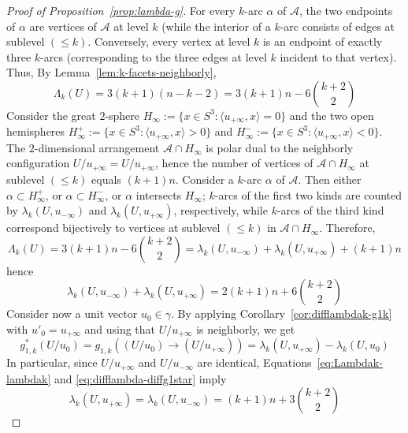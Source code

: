 \documentclass[11pt]{article}
\renewcommand{\leq}{\leqslant}
\begin{document}
\begin{proof}[Proof of Proposition~\ref{prop:lambda-g}]
For every $k$-arc $\alpha$ of  $\mathcal{A}$, the two endpoints of $\alpha$ are vertices of $\mathcal{A}$ at level $k$ (while the interior of a $k$-arc consists of edges at sublevel $(\leq k)$. Conversely, every vertex at level $k$ is an endpoint of exactly three $k$-arcs (corresponding to the three edges at level $k$ incident to that vertex). Thus, By Lemma~\ref{lem:k-facets-neighborly},
\begin{equation}
\label{eq:Lambdak}
\Lambda_k(U)=3(k+1)(n-k-2)=3(k+1)n-6\binom{k+2}{2}
\end{equation}
Consider the great $2$-sphere $H_{\infty}:=\{x\in S^3\colon \langle u_{+\infty},x\rangle =0\}$ and the two open hemispheres $H^+_{\infty}:=\{x\in S^3\colon \langle u_{+\infty},x\rangle > 0\}$
and $H^-_{\infty}:=\{x\in S^3\colon \langle u_{+\infty},x\rangle < 0\}$. The $2$-dimensional arrangement $\mathcal{A}\cap H_{\infty}$ is polar dual to the neighborly configuration $U/u_{+\infty}=U/u_{+\infty}$, hence the number of vertices of $\mathcal{A}\cap H_{\infty}$ at sublevel $(\leq k)$ equals $(k+1)n$.
%
Consider a $k$-arc $\alpha$ of $\mathcal{A}$. Then either $\alpha \subset H^+_{\infty}$, or $\alpha \subset H^-_{\infty}$, or $\alpha$ intersects $H_\infty$; $k$-arcs of the first two kinds are counted by $\lambda_k(U,u_{-\infty})$ and $\lambda_k(U,u_{+\infty})$, respectively, while $k$-arcs of the third kind correspond bijectively to vertices at sublevel $(\leq k)$ in $\mathcal{A}\cap H_{\infty}$. Therefore,
\[
\Lambda_k(U)=3(k+1)n-6\binom{k+2}{2}=\lambda_k(U,u_{-\infty}) + \lambda_k(U,u_{+\infty}) +(k+1)n
\]
hence
\begin{equation}
\label{eq:Lambdak-lambdak}
\lambda_k(U,u_{-\infty}) + \lambda_k(U,u_{+\infty}) = 2(k+1)n + 6\binom{k+2}{2}
\end{equation}
Consider now a unit vector $u_0 \in \gamma$. By applying Corollary~\ref{cor:difflambdak-g1k} with $u'_0 =u_{+\infty}$ and using that $U/u_{+\infty}$ is neighborly, we get
\begin{equation}
\label{eq:difflambda-diffg1star}
g^*_{1,k}(U/u_0) = g_{1,k}((U/u_0) \to (U/u_{+\infty}))
= \lambda_k(U,u_{+\infty}) - \lambda_k(U,u_0)
\end{equation}
In particular, since $U/u_{+\infty}$ and $U/u_{-\infty}$ are identical, Equations~\eqref{eq:Lambdak-lambdak} and \eqref{eq:difflambda-diffg1star}  imply
\begin{equation}
\label{eq:lambdapminfty}
\lambda_k(U,u_{+\infty}) = \lambda_k(U,u_{-\infty}) = (k+1)n + 3\binom{k+2}{2}

\end{equation}
\end{proof}
\end{document}
